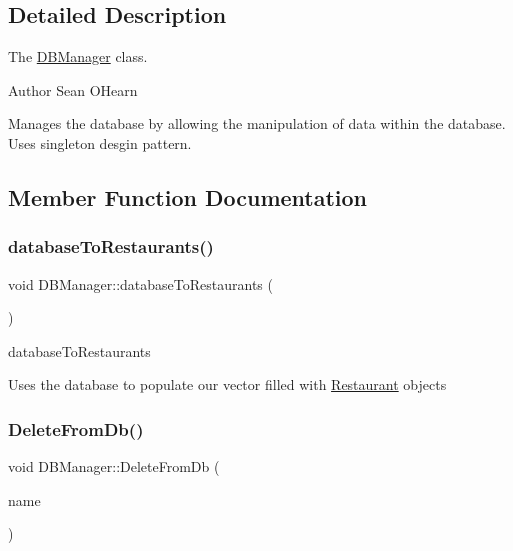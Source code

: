 \subsection{Detailed Description}
The \hyperlink{class_d_b_manager}{D\+B\+Manager} class. 

\begin{DoxyAuthor}{Author}
Sean O\textquotesingle{}Hearn
\end{DoxyAuthor}
Manages the database by allowing the manipulation of data within the database. Uses singleton desgin pattern. 

\subsection{Member Function Documentation}
\mbox{\label{class_d_b_manager_a914d5a2d66ddff2b0a39c545966540e9}} 
\subsubsection{\texorpdfstring{database\+To\+Restaurants()}{databaseToRestaurants()}}
{\footnotesize\ttfamily void D\+B\+Manager\+::database\+To\+Restaurants (\begin{DoxyParamCaption}{ }\end{DoxyParamCaption})}



database\+To\+Restaurants 

Uses the database to populate our vector filled with \hyperlink{class_restaurant}{Restaurant} objects \mbox{\label{class_d_b_manager_ac2f9bedac3778197de1301775ef8d42f}} 
\subsubsection{\texorpdfstring{Delete\+From\+Db()}{DeleteFromDb()}}
{\footnotesize\ttfamily void D\+B\+Manager\+::\+Delete\+From\+Db (\begin{DoxyParamCaption}\item[{Q\+String}]{name }\end{DoxyParamCaption})}



